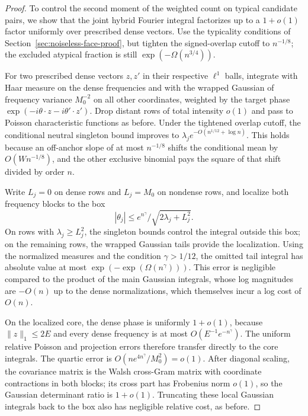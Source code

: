 \begin{proof}
To control the second moment of the weighted count on typical candidate pairs, we show that the joint hybrid Fourier integral factorizes up to a \(1+o(1)\) factor uniformly over prescribed dense vectors. Use the typicality conditions of Section~\ref{sec:noiseless-face-proof}, but tighten the signed-overlap cutoff to \(n^{-1/8}\); the excluded atypical fraction is still \(\exp(-\Omega(n^{3/4}))\).

For two prescribed dense vectors \(z,z'\) in their respective \(\ell^1\) balls, integrate with Haar measure on the dense frequencies and with the wrapped Gaussian of frequency variance \(M_0^{-2}\) on all other coordinates, weighted by the target phase \(\exp(-i\theta\cdot z-i\theta'\cdot z')\). Drop distant rows of total intensity \(o(1)\) and pass to Poisson characteristic functions as before. Under the tightened overlap cutoff, the conditional neutral singleton bound improves to \(\lambda_j e^{-O(n^{1/12}+\log n)}\). This holds because an off-anchor slope of at most \(n^{-1/8}\) shifts the conditional mean by \(O(Wn^{-1/8})\), and the other exclusive binomial pays the square of that shift divided by order \(n\).

Write \(L_j=0\) on dense rows and \(L_j=M_0\) on nondense rows, and localize both frequency blocks to the box
\[
 |\theta_j|\le e^{n^\gamma}/\sqrt{2\lambda_j+L_j^2} .
\]
On rows with \(\lambda_j\ge L_j^2\), the singleton bounds control the integral outside this box; on the remaining rows, the wrapped Gaussian tails provide the localization. Using the normalized measures and the condition \(\gamma>1/12\), the omitted tail integral has absolute value at most \(\exp(-\exp(\Omega(n^\gamma)))\). This error is negligible compared to the product of the main Gaussian integrals, whose log magnitudes are \(-O(n)\) up to the dense normalizations, which themselves incur a log cost of \(O(n)\).

On the localized core, the dense phase is uniformly \(1+o(1)\), because \(\|z\|_1\le2E\) and every dense frequency is at most \(O(E^{-1}e^{-n^\gamma})\). The uniform relative Poisson and projection errors therefore transfer directly to the core integrals. The quartic error is \(O(ne^{4n^\gamma}/M_0^2)=o(1)\). After diagonal scaling, the covariance matrix is the Walsh cross-Gram matrix with coordinate contractions in both blocks; its cross part has Frobenius norm \(o(1)\), so the Gaussian determinant ratio is \(1+o(1)\). Truncating these local Gaussian integrals back to the box also has negligible relative cost, as before.


\end{proof}
